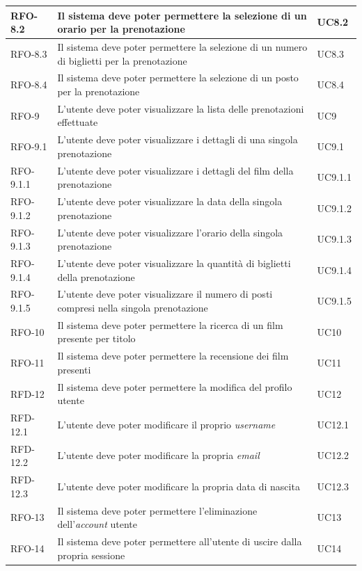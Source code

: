 \begin{center}
\begin{tabularx}{\textwidth}{|>{\hsize=0.4\hsize\centering\arraybackslash}X|>{\hsize=2.2\hsize\centering}X|>{\hsize=0.4\hsize\centering\arraybackslash}X|}
\hline
RFO-8.2 & Il sistema deve poter permettere la selezione di un orario per la prenotazione & UC8.2 \\
\hline
RFO-8.3 & Il sistema deve poter permettere la selezione di un numero di biglietti per la prenotazione & UC8.3 \\
\hline
RFO-8.4 & Il sistema deve poter permettere la selezione di un posto per la prenotazione & UC8.4 \\
\hline
RFO-9 & L'utente deve poter visualizzare la lista delle prenotazioni effettuate & UC9 \\
\hline
RFO-9.1 & L'utente deve poter visualizzare i dettagli di una singola prenotazione & UC9.1 \\
\hline
RFO-9.1.1 & L'utente deve poter visualizzare i dettagli del film della prenotazione & UC9.1.1 \\
\hline
RFO-9.1.2 & L'utente deve poter visualizzare la data della singola prenotazione & UC9.1.2 \\
\hline
RFO-9.1.3 & L'utente deve poter visualizzare l'orario della singola prenotazione & UC9.1.3 \\
\hline
RFO-9.1.4 & L'utente deve poter visualizzare la quantità di biglietti della prenotazione & UC9.1.4 \\
\hline
RFO-9.1.5 & L'utente deve poter visualizzare il numero di posti compresi nella singola prenotazione & UC9.1.5 \\
\hline
RFO-10 & Il sistema deve poter permettere la ricerca di un film presente per titolo & UC10 \\
\hline
RFO-11 & Il sistema deve poter permettere la recensione dei film presenti & UC11 \\
\hline
RFD-12 & Il sistema deve poter permettere la modifica del profilo utente & UC12 \\
\hline
RFD-12.1 & L'utente deve poter modificare il proprio \textit{username} & UC12.1 \\
\hline
RFD-12.2 & L'utente deve poter modificare la propria \textit{email} & UC12.2 \\
\hline
RFD-12.3 & L'utente deve poter modificare la propria data di nascita & UC12.3 \\
\hline
RFO-13 & Il sistema deve poter permettere l'eliminazione dell'\textit{account} utente & UC13 \\
\hline
RFO-14 & Il sistema deve poter permettere all'utente di uscire dalla propria sessione & UC14 \\
\hline
\end{tabularx}
\end{center}

